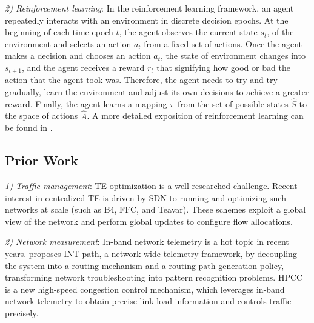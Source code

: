 \documentclass[10pt,conference]{IEEEtran}
\begin{document}
\emph{2) Reinforcement learning}: In the reinforcement learning framework, an agent repeatedly interacts with an environment in discrete decision epochs. At the beginning of each time epoch $t$, the agent observes the current state $s_{t}$, of the environment and selects an action $a_{t}$ from a fixed set of actions. Once the agent makes a decision and chooses an action $a_{t}$, the state of environment changes into $s_{t+1}$, and the agent receives a reward $r_{t}$ that signifying how good or bad the action that the agent took was. Therefore, the agent needs to try and try gradually, learn the environment and adjust its own decisions to achieve a greater reward. Finally, the agent learns a mapping $\pi$ from the set of possible states $\widehat{S}$ to the space of actions $\widehat{A}$. A more detailed exposition of reinforcement learning can be found in \cite{kaelbling1996reinforcement}.
\subsection{Prior Work}
\emph{1) Traffic management}: TE optimization is a well-researched challenge. Recent interest in centralized TE is driven by SDN to running and optimizing such networks at scale (such as B4\cite{jain2013b4}, FFC\cite{liu2014traffic}, and Teavar\cite{bogle2019teavar}). These schemes exploit a global view of the network and perform global updates to configure flow allocations.

\emph{2) Network measurement}: In-band network telemetry is a hot topic in recent years. \cite{pan2019int} proposes INT-path, a network-wide telemetry framework, by decoupling the system into a routing mechanism and a routing path generation policy, transforming network troubleshooting into pattern recognition problems. HPCC \cite{li2019hpcc} is a new high-speed congestion control mechanism, which leverages in-band network telemetry to obtain precise link load information and controls traffic precisely.
\end{document}

